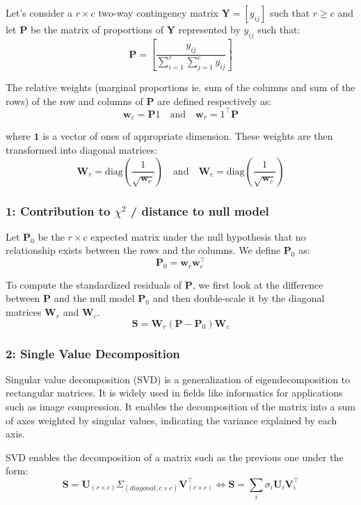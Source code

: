 Let's consider a $r \times c$ two-way contingency matrix $\mathbf{Y} = [y_{ij}]$ such that $r\geq c$ and let $\mathbf{P}$ be the matrix of proportions of $\mathbf{Y}$ represented by $y_{ij}$ such that:
$$
\mathbf{P} = \left[ \frac{y_{ij}}{\sum_{i=1}^{r} \sum_{j=1}^{c} y_{ij}} \right]
$$

The relative weights (marginal proportions ie. sum of the columns and sum of the rows) of the row and columns of $\mathbf{P}$ are defined respectively as: 
$$
    \mathbf{w}_c = \mathbf{P}1 \quad \text{and} \quad \mathbf{w}_r = 1^\intercal\mathbf{P}
$$

where \(\mathbf{1}\) is a vector of ones of appropriate dimension.
These weights are then transformed into diagonal matrices: 
$$
    \mathbf{W}_r = \text{diag}\left(\frac{1}{\sqrt{\mathbf{w}_r}}\right) \quad \text{and} \quad \mathbf{W}_c = \text{diag}\left(\frac{1}{\sqrt{\mathbf{w}_c}}\right)
$$

\subsubsection{1: Contribution to $\chi^2$ / distance to null model}

Let $\mathbf{P}_0$ be the $r\times c$ expected matrix under the null hypothesis that no relationship exists between the rows and the columns. We define $\mathbf{P}_0$ as:
$$
    \mathbf{P}_0 = \mathbf{w}_r \mathbf{w}_c^\intercal
$$

To compute the standardized residuals of $\mathbf{P}$, we first look at the difference between $\mathbf{P}$ and the null model $\mathbf{P}_0$ and then double-scale it by the diagonal matrices $\mathbf{W}_r$ and $\mathbf{W}_c$. 
$$
    \mathbf{S} = \mathbf{W}_r (\mathbf{P} - \mathbf{P}_0) \mathbf{W}_c
$$

\subsubsection{2: Single Value Decomposition}

Singular value decomposition (SVD) is a generalization of eigendecomposition to rectangular matrices. It is widely used in fields like informatics for applications such as image compression. It enables the decomposition of the matrix into a sum of axes weighted by singular values, indicating the variance explained by each axis.

SVD enables the decomposition of a matrix such as the previous one under the form: 
$$
    \mathbf{S} = \mathbf{U}_{(r\times c)} \Sigma_{(diagonal, c\times c)} \mathbf{V}_{(c \times c)}^\intercal \Leftrightarrow \mathbf{S} = \sum_i \sigma_i \mathbf{U}_i \mathbf{V}_i^\intercal
$$

